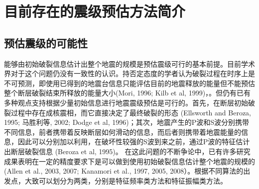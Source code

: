 
\chapter{目前存在的震级预估方法简介}

\section{预估震级的可能性}

    \indent 能够由初始破裂信息估计出整个地震的规模是预估震级可行的基本前提。目前学术界对于这个问题仍没有一致性的认识。持否定态度的学者认为破裂过程在时序上是不可预测，即使用已得到的地震台信息只能评估目前的地震释放的能量但不能预估整个断层破裂结束所释放的能量大小(Mori, 1996; Kilb et al, 1999)，。但仍有已有多种观点支持根据少量初始信息进行地震震级预估是可行的。首先，在断层初始破裂过程中存在成核震相，而它直接决定了最终破裂的形态 (Ellsworth and Beroza, 1995; 马胜利等, 2002; Dodge et al, 1996)；其次，地震产生的P波和S波分别携带不同信息，前者携带着反映断层如何滑动的信息，而后者则携带着地震能量的信息，因此可以分别加以利用，在破坏性较强的S波到来之前，通过P波的特征估计出断层破裂信息 (Beroza et al, 1995)。
在这此问题的不断争论中，已有许多研究成果表明在一定的精度要求下是可以做到使用初始破裂信息估计整个地震的规模的 (Allen et al., 2003, 2007; Kanamori et al., 1997, 2005, 2008）。根据不同算法的出发点，大致可以划分为两类，分别是特征频率类方法和特征振幅类方法。

